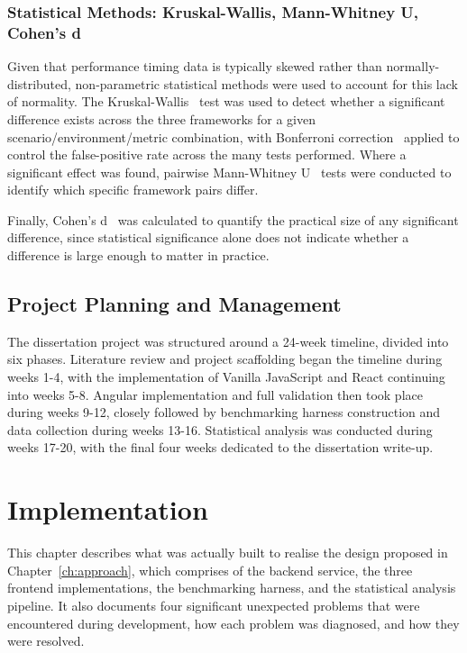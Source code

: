 \documentclass[11pt,a4paper]{report}
\begin{document}
\subsection{Statistical Methods: Kruskal-Wallis, Mann-Whitney U, Cohen's d}

Given that performance timing data is typically skewed rather than normally-distributed, non-parametric statistical methods were used to account for this lack of normality. The Kruskal-Wallis~\cite{kruskal-wallis} test was used to detect whether a significant difference exists across the three frameworks for a given scenario/environment/metric combination, with Bonferroni correction~\cite{dunn-bonferroni} applied to control the false-positive rate across the many tests performed. Where a significant effect was found, 
pairwise Mann-Whitney U~\cite{mann-whitney} tests were conducted to identify which specific framework pairs differ.

\vspace{5mm}

Finally, Cohen's d~\cite{cohen1988}  was calculated to quantify the practical size of any significant difference, since statistical significance alone does not indicate whether a difference is large enough to matter in practice. 

\section{Project Planning and Management}

The dissertation project was structured around a 24-week timeline, divided into six phases. Literature review and project scaffolding began the timeline during weeks 1-4, with the implementation of Vanilla JavaScript and React continuing into weeks 5-8. Angular implementation and full validation then took place during weeks 9-12, closely followed by benchmarking harness construction and data collection during weeks 13-16. Statistical analysis was conducted during weeks 17-20, with the final four weeks dedicated to the dissertation write-up. 


\chapter{Implementation}
\label{ch:implementation}

This chapter describes what was actually built to realise the design proposed in Chapter~\ref{ch:approach}, which comprises of the backend service, the three frontend implementations, the benchmarking harness, and the statistical analysis pipeline. It also documents four significant unexpected problems that were encountered during development, how each problem was diagnosed, and how they were resolved. 
\end{document}

